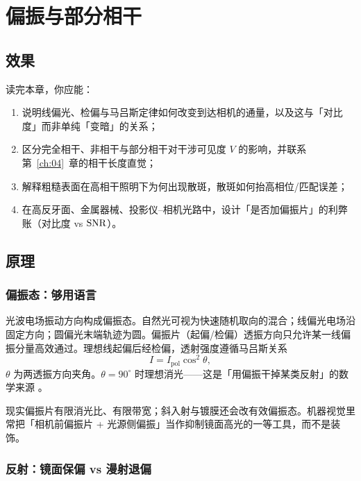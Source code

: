\chapter{偏振与部分相干}
\label{ch:05}

\section{效果}
\label{sec:ch04-effect}

读完本章，你应能：
\begin{enumerate}
  \item 说明线偏光、检偏与马吕斯定律如何改变到达相机的通量，以及这与「对比度」而非单纯「变暗」的关系；
  \item 区分完全相干、非相干与部分相干对干涉可见度 $V$ 的影响，并联系第~\ref{ch:04}~章的相干长度直觉；
  \item 解释粗糙表面在高相干照明下为何出现散斑，散斑如何抬高相位/匹配误差；
  \item 在高反牙面、金属器械、投影仪–相机光路中，设计「是否加偏振片」的利弊账（对比度 vs $\mathrm{SNR}$）。
\end{enumerate}

\section{原理}
\label{sec:ch04-principle}

\subsection{偏振态：够用语言}

光波电场振动方向构成偏振态。自然光可视为快速随机取向的混合；线偏光电场沿固定方向；圆偏光末端轨迹为圆。偏振片（起偏/检偏）透振方向只允许某一线偏振分量高效通过。理想线起偏后经检偏，透射强度遵循马吕斯关系
\begin{equation}
  I = I_{\mathrm{pol}}\cos^{2}\theta,
  \label{eq:ch05-malus}
\end{equation}
$\theta$ 为两透振方向夹角。$\theta=90^\circ$ 时理想消光——这是「用偏振干掉某类反射」的数学来源 \citep{HechtOptics}。

现实偏振片有限消光比、有限带宽；斜入射与镀膜还会改有效偏振态。机器视觉里常把「相机前偏振片 + 光源侧偏振」当作抑制镜面高光的一等工具，而不是装饰。

\subsection{反射：镜面保偏 vs 漫射退偏}

